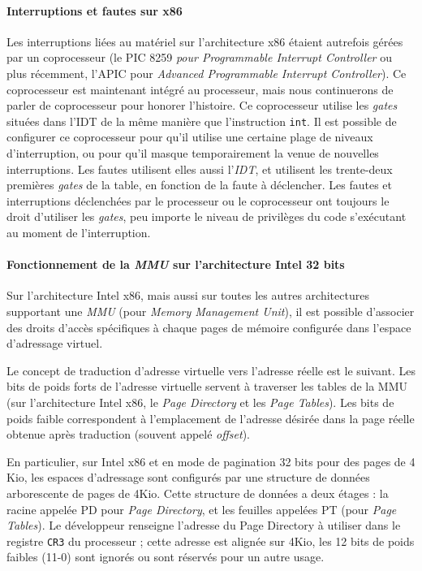 \paragraph{Interruptions et fautes sur x86}

Les interruptions liées au matériel sur l'architecture x86 étaient autrefois gérées par un coprocesseur (le PIC 8259 \emph{pour Programmable Interrupt Controller} ou plus récemment, l'APIC pour \emph{Advanced Programmable Interrupt Controller}). Ce coprocesseur est maintenant intégré au processeur, mais nous continuerons de parler de coprocesseur pour honorer l'histoire. Ce coprocesseur utilise les \emph{gates} situées dans l'IDT de la même manière que l'instruction \texttt{int}. Il est possible de configurer ce coprocesseur
pour qu'il utilise une certaine plage de niveaux d'interruption, ou pour qu'il masque temporairement la venue de nouvelles interruptions. Les fautes utilisent elles aussi l'\emph{IDT}, et utilisent les trente-deux premières \emph{gates} de la table, en fonction de la faute à déclencher. Les fautes et interruptions déclenchées par le processeur ou le coprocesseur ont toujours le droit d'utiliser les \emph{gates}, peu importe le niveau de privilèges du code s'exécutant au moment de l'interruption.

\paragraph{Fonctionnement de la \emph{MMU} sur l'architecture Intel 32 bits}
\label{sec:intel_mmu}
Sur l'architecture Intel x86, mais aussi sur toutes les autres architectures supportant une \emph{MMU} (pour \emph{Memory Management Unit}), il est possible d'associer des droits d'accès spécifiques à chaque pages de mémoire configurée dans l'espace d'adressage virtuel.

Le concept de traduction d'adresse virtuelle vers l'adresse réelle est le suivant. Les bits de poids forts de l'adresse virtuelle servent à traverser les tables de la MMU (sur l'architecture Intel x86, le \emph{Page Directory} et les \emph{Page Tables}). Les bits de poids faible correspondent à l'emplacement de l'adresse désirée dans la page réelle obtenue après traduction (souvent appelé \emph{offset}).

En particulier, sur Intel x86 et en mode de pagination 32 bits pour des pages de 4 Kio, les espaces d'adressage sont configurés par une structure de données arborescente de pages de 4Kio. Cette structure de données a deux étages : la racine appelée PD pour \emph{Page Directory}, et les feuilles appelées PT (pour \emph{Page Tables}). Le développeur renseigne l'adresse du Page Directory à utiliser dans le registre \texttt{CR3} du processeur ; cette adresse est alignée sur 4Kio, les 12 bits de poids faibles (11-0) sont ignorés ou sont réservés pour un autre usage.

